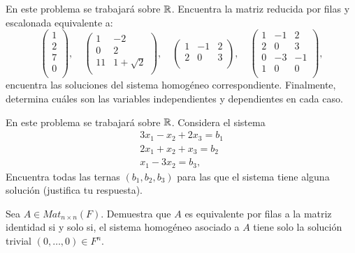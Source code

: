 \documentclass[12pt,a4paper]{book}
\begin{document}
    \begin{ejercicio}
        En este problema se trabajará sobre $\mathbb{R}$. Encuentra la matriz reducida por filas y escalonada equivalente a:
        \[
        \begin{pmatrix}
            1\\
            2\\
            7\\
            0\\
        \end{pmatrix},
        \quad
        \begin{pmatrix}
            1 & -2 \\
            0 & 2 \\
            11 & 1 + \sqrt{2}\\
        \end{pmatrix},
        \quad
        \begin{pmatrix}
            1 & -1 & 2\\
            2 & 0 & 3\\
        \end{pmatrix},
        \quad
        \begin{pmatrix}
            1 & -1 & 2\\
            2 & 0 & 3\\
            0 & -3 & -1\\
            1 & 0 & 0\\
        \end{pmatrix},
        \]
        encuentra las soluciones del sistema homogéneo correspondiente. Finalmente, determina cuáles son las variables independientes y dependientes en cada caso.
    \end{ejercicio}

    \begin{ejercicio}
        En este problema se trabajará sobre $\mathbb{R}$. Considera el sistema
        \begin{align*}
            3x_1 - x_2 + 2x_3 = b_1\\
            2x_1 + x_2 + x_3 = b_2\\
            x_1 - 3x_2 = b_3,
        \end{align*}
        Encuentra todas las ternas $(b_1, b_2, b_3)$ para las que el sistema tiene alguna solución (justifica tu respuesta).
    \end{ejercicio}

    \begin{ejercicio}
        Sea $A \in Mat_{n \times n}(F)$. Demuestra que $A$ es equivalente por filas a la matriz identidad si y solo si, el sistema homogéneo asociado a $A$ tiene solo la solución trivial $(0, \dots , 0) \in F^n$.
    \end{ejercicio}
\end{document}

